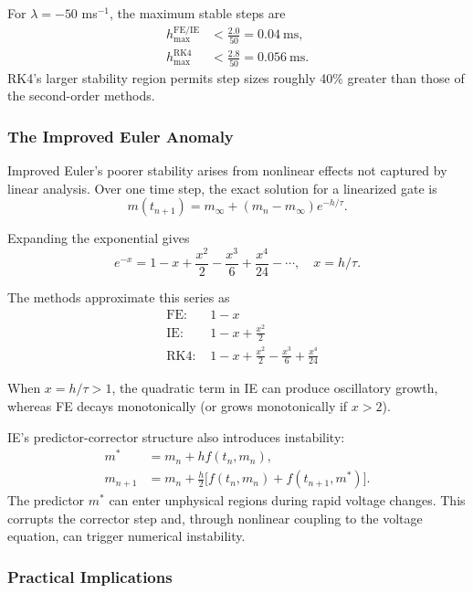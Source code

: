     For $\lambda = -50$ ms$^{-1}$, the maximum stable steps are
    \begin{align*}
        h_{\max}^{\text{FE/IE}} &< \frac{2.0}{50} = 0.04~\text{ms}, \\
        h_{\max}^{\text{RK4}}   &< \frac{2.8}{50} = 0.056~\text{ms}.
    \end{align*}
    RK4's larger stability region permits step sizes roughly 40\% greater than those of the second-order methods.

\subsubsection{The Improved Euler Anomaly}

    Improved Euler's poorer stability arises from nonlinear effects not captured by linear analysis.  
    Over one time step, the exact solution for a linearized gate is
    \[
    m(t_{n+1}) = m_\infty + (m_n - m_\infty)e^{-h/\tau}.
    \]
    
    Expanding the exponential gives
    \[
    e^{-x} = 1 - x + \frac{x^2}{2} - \frac{x^3}{6} + \frac{x^4}{24} - \cdots, \quad x = h/\tau.
    \]
    
    The methods approximate this series as
    \begin{align*}
        &\text{FE: } & 1 - x \\
        &\text{IE: } & 1 - x + \frac{x^2}{2} \\
        &\text{RK4: } & 1 - x + \frac{x^2}{2} - \frac{x^3}{6} + \frac{x^4}{24}
    \end{align*}
    
    When $x = h/\tau > 1$, the quadratic term in IE can produce oscillatory growth, whereas FE decays monotonically (or grows monotonically if $x > 2$).
    
    IE's predictor-corrector structure also introduces instability:
    \begin{align*}
        m^* &= m_n + h f(t_n, m_n), \\
        m_{n+1} &= m_n + \frac{h}{2}\big[f(t_n, m_n) + f(t_{n+1}, m^*)\big].
    \end{align*}
    The predictor $m^*$ can enter unphysical regions during rapid voltage changes.  
    This corrupts the corrector step and, through nonlinear coupling to the voltage equation, can trigger numerical instability.

\subsubsection{Practical Implications}

